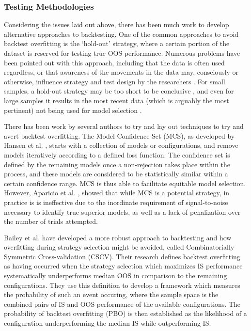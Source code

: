 \documentclass[a4paper,11pt,oneside]{article}
\theoremstyle{plain}
\theoremstyle{definition}
\begin{document}
\subsubsection{Testing Methodologies}\label{lr_cscv}

Considering the issues laid out above, there has been much work to develop alternative approaches to backtesting. 
One of the common approaches to avoid backtest overfitting is the ‘hold-out’ strategy, where a certain portion of 
the dataset is reserved for testing true OOS performance. Numerous problems have been pointed out with this 
approach, including that the data is often used regardless, or that awareness of the movements in the data may, 
consciously or otherwise, influence strategy and test design by the researchers \cite{Schorfheide}. For small samples, 
a hold-out strategy may be too short to be conclusive \cite{Weiss}, and even for large samples it results in the 
most recent data (which is arguably the most pertinent) not being used for model selection \cite{Hawkins, BailyPBO}.
\hfill \break 

There has been work by several authors to try and lay out techniques to try and avert backtest overfitting. 
The Model Confidence Set (MCS), as developed by Hansen et al. \cite{Hansen}, starts with a 
collection of models or configurations, and remove models iteratively according to a defined loss function. 
The confidence set is defined by the remaining models once a non-rejection takes place within the process, and 
these models are considered to be statistically similar within a certain confidence range. MCS is thus able to facilitate 
equitable model selection. However, Aparicio et al. \cite{Aparicio}, showed  that while MCS is a potential strategy, in 
practice is is ineffective due to the inordinate requirement of signal-to-noise necessary to identify true superior 
models, as well as a lack of penalization over the number of trials attempted.
\hfill \break

Bailey et al. \cite{BailyPBO} have developed a more robust approach to backtesting and how overfitting during strategy 
selection might be avoided, called Combinatorially Symmetric Cross-validation (CSCV). Their research defines backtest overfitting as having occurred when the strategy selection which maximizes IS performance systematically underperforms median OOS in comparison to the remaining configurations. They use this definition to develop a framework which measures the probability of such an event occuring, where the sample space is the combined pairs of IS and OOS performance of the available configurations. The probability of backtest overfitting (PBO) is then established as the likelihood of a configuration underperforming the median IS while outperforming IS. 
\hfill \break 
\end{document}
